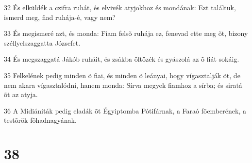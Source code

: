 \par 32 És elküldék a czifra ruhát, és elvivék atyjokhoz és mondának: Ezt találtuk, ismerd meg, fiad ruhája-é, vagy nem?
\par 33 És megismeré azt, és monda: Fiam felsõ ruhája ez, fenevad ette meg õt, bizony széllyelszaggatta Józsefet.
\par 34 És megszaggatá Jákób ruháit, és zsákba öltözék és gyászolá az õ fiát sokáig.
\par 35 Felkelének pedig minden õ fiai, és minden õ leányai, hogy vígasztalják õt, de nem akara vígasztalódni, hanem monda: Sírva megyek fiamhoz a sírba; és siratá õt az atyja.
\par 36 A Midiániták pedig eladák õt Égyiptomba Pótifárnak, a Faraó fõemberének, a testõrök fõhadnagyának.

\chapter{38}

